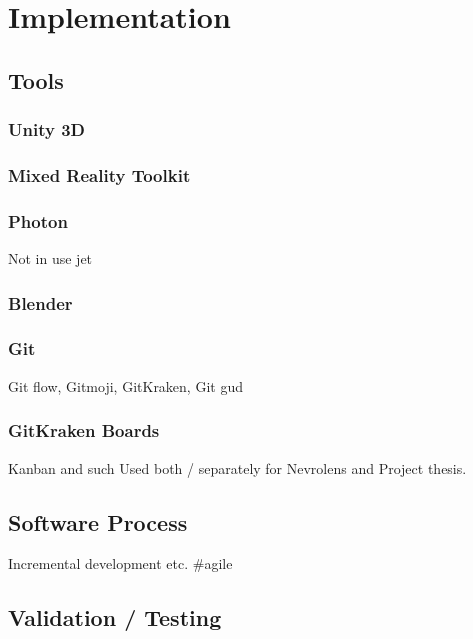 


\chapter{Implementation}

\section{Tools}\label{chap:tools}


\subsection*{Unity 3D}\label{chap:unity}

\subsection*{Mixed Reality Toolkit}\label{chap:mrtk}


\subsection*{Photon}\label{chap:photon}
Not in use jet

\subsection*{Blender}

\subsection*{Git}
Git flow, Gitmoji, GitKraken, Git gud 

\subsection*{GitKraken Boards}
Kanban and such
Used both / separately for Nevrolens and Project thesis.


\section{Software Process}
Incremental development etc. \#agile

\section{Validation / Testing}


